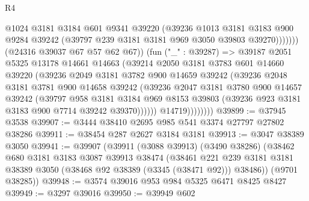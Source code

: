 \begin{lexlean}{R4}
\begin{coremodule}
                              @1024
                              @3181
                              @3184
                              @601
                              @9341
                              @39220
                              (@39236
                                @1013
                                @3181
                                @3183
                                @900
                                @9284
                                @39242
                                (@39797 @239 @3181 @3181 @969 @3050 @39803 @39270)))))))
                    (@24316 @39037 @67 @57 @62 @67))
                  (fun ("_" : @39287) =>
                  @39187
                    @2051
                    @5325
                    @13178
                    @14661
                    @14663
                    (@39214
                      @2050
                      @3181
                      @3783
                      @601
                      @14660
                      @39220
                      (@39236
                        @2049
                        @3181
                        @3782
                        @900
                        @14659
                        @39242
                        (@39236
                          @2048
                          @3181
                          @3781
                          @900
                          @14658
                          @39242
                          (@39236
                            @2047
                            @3181
                            @3780
                            @900
                            @14657
                            @39242
                            (@39797
                              @958
                              @3181
                              @3184
                              @969
                              @8153
                              @39803
                              (@39236 @923 @3181 @3183 @900 @7714 @39242 @39370))))))
                    @14719))))))))
@39899 := @37945 @3538
@39907 := @3444 @38410 @2695 @985 @541 @3374 @27797 @27802 @38286
@39911 := @38454 @287 @2627 @3184 @3181
@39913 := @3047 @38389 @3050
@39941 := @39907
    (@39911
      (@3088 @39913)
      (@3490 @38286)
      (@38462
        @680
        @3181
        @3183
        @3087
        @39913
        @38474
        (@38461 @221 @239 @3181 @3181 @38389 @3050 (@38468 @92 @38389 (@3345 (@38471 @92))) @38486))
      (@9701 @38285))
@39948 := @3574 @39016 @953 @984 @5325 @6471 @8425 @8427
@39949 := @3297 @39016
@39950 := @39949 @602

\end{coremodule}
\end{lexlean}
